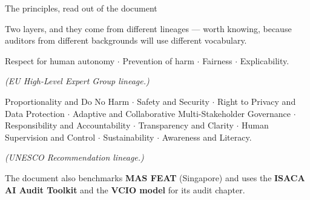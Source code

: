 \documentclass[aspectratio=169,11pt,t]{beamer}
\begin{document}
\begin{frame}[shrink=25]{The principles, read out of the document}
{\fontsize{9.4}{12.6}\selectfont\color{fg2}Two layers, and they come from different lineages --- worth knowing, because auditors from different backgrounds will use different vocabulary.\par}\vskip 4pt
\begin{minipage}[t]{0.494\textwidth}
\begin{icardaccent}
Respect for human autonomy $\cdot$ Prevention of harm $\cdot$ Fairness $\cdot$ Explicability.

\textit{(EU High-Level Expert Group lineage.)}
\end{icardaccent}
\end{minipage}%
\hfill
\begin{minipage}[t]{0.494\textwidth}
\begin{icardaccent}
Proportionality and Do No Harm $\cdot$ Safety and Security $\cdot$ Right to Privacy and Data Protection $\cdot$ Adaptive and Collaborative Multi-Stakeholder Governance $\cdot$ Responsibility and Accountability $\cdot$ Transparency and Clarity $\cdot$ Human Supervision and Control $\cdot$ Sustainability $\cdot$ Awareness and Literacy.

\textit{(UNESCO Recommendation lineage.)}
\end{icardaccent}
\end{minipage}%
{\fontsize{9.4}{12.6}\selectfont\color{fg2}The document also benchmarks \textbf{MAS FEAT} (Singapore) and uses the \textbf{ISACA AI Audit Toolkit} and the \textbf{VCIO model} for its audit chapter.\par}\vskip 4pt
\end{frame}
\end{document}
